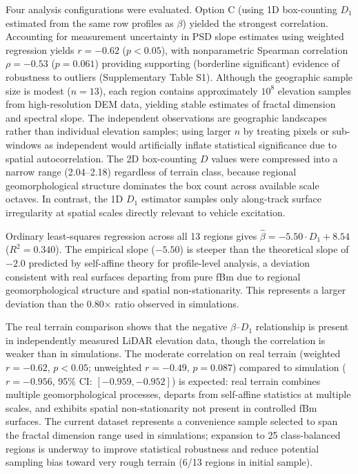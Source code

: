 \documentclass[11pt]{article}
\begin{document}
Four analysis configurations were evaluated. Option C (using 1D box-counting $D_1$ estimated from the same row profiles as $\beta$) yielded the strongest correlation. Accounting for measurement uncertainty in PSD slope estimates using weighted regression yields $r = -0.62$ ($p < 0.05$), with nonparametric Spearman correlation $\rho = -0.53$ ($p = 0.061$) providing supporting (borderline significant) evidence of robustness to outliers (Supplementary Table S1). Although the geographic sample size is modest ($n=13$), each region contains approximately $10^8$ elevation samples from high-resolution DEM data, yielding stable estimates of fractal dimension and spectral slope. The independent observations are geographic landscapes rather than individual elevation samples; using larger $n$ by treating pixels or sub-windows as independent would artificially inflate statistical significance due to spatial autocorrelation. The 2D box-counting $D$ values were compressed into a narrow range (2.04--2.18) regardless of terrain class, because regional geomorphological structure dominates the box count across available scale octaves. In contrast, the 1D $D_1$ estimator samples only along-track surface irregularity at spatial scales directly relevant to vehicle excitation.

Ordinary least-squares regression across all 13 regions gives $\hat{\beta} = -5.50 \cdot D_1 + 8.54$ ($R^2 = 0.340$). The empirical slope ($-5.50$) is steeper than the theoretical slope of $-2.0$ predicted by self-affine theory for profile-level analysis, a deviation consistent with real surfaces departing from pure fBm due to regional geomorphological structure and spatial non-stationarity. This represents a larger deviation than the 0.80$\times$ ratio observed in simulations.

The real terrain comparison shows that the negative $\beta$--$D_1$ relationship is present in independently measured LiDAR elevation data, though the correlation is weaker than in simulations. The moderate correlation on real terrain (weighted $r = -0.62$, $p < 0.05$; unweighted $r = -0.49$, $p = 0.087$) compared to simulation ($r = -0.956$, 95\% CI: $[-0.959, -0.952]$) is expected: real terrain combines multiple geomorphological processes, departs from self-affine statistics at multiple scales, and exhibits spatial non-stationarity not present in controlled fBm surfaces. The current dataset represents a convenience sample selected to span the fractal dimension range used in simulations; expansion to 25 class-balanced regions is underway to improve statistical robustness and reduce potential sampling bias toward very rough terrain (6/13 regions in initial sample).
\end{document}
